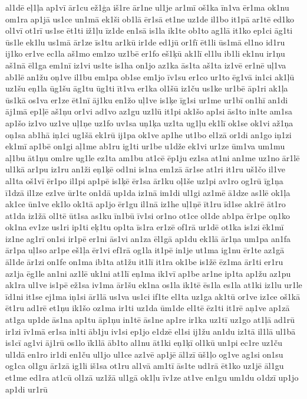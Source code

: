 {al1dē
eļ1ļa
ap1vī
ār1cu
ež1ģa
iš1re
ār1ne
ul1je
ar1mī
oš1ka
īn1va
ēr1ma
ok1nu
om1ra
ap1jā
us1ce
un1mā
ek1ši
ob1lā
ēr1sā
et1ne
uz1de
il1bo
it1pā
ar1tē
ed1ko
ol1vī
ot1rī
us1se
ēt1ti
iž1ļu
īz1de
en1sā
is1la
ik1te
ob1to
ag1lā
it1ko
ep1ci
āg1ti
ūs1le
ek1lu
us1mā
ār1ze
īs1tu
ar1kū
ir1de
ed1jū
or1fī
ēt1li
ūs1mā
el1no
id1ru
ij1ko
er1ve
ec1la
aš1mo
em1zo
uz1bē
er1fo
eš1ķū
ak1lī
el1lu
ib1li
ek1nu
ir1ņu
aš1nā
ēl1ga
em1nī
iz1vi
us1te
is1ha
on1jo
az1ka
ās1ta
aš1ta
iz1vē
er1nē
uļ1va
ab1lē
an1žu
oņ1ve
il1bu
em1pa
ob1se
em1jo
īv1su
er1co
ur1to
ēg1vā
in1ci
ak1ļū
uz1šu
eņ1la
ūg1šu
āg1tu
ūg1ti
īt1va
er1ka
ol1šū
iz1ču
us1ke
ur1bē
āp1ri
ak1ļa
ūs1kā
os1va
er1ze
ēt1nī
āj1ku
en1žo
uļ1ve
is1ķe
īg1si
ur1me
ur1bī
on1hī
an1di
āj1mā
ep1ļē
aš1ņu
or1vi
ad1vo
az1gu
uz1lū
it1pi
ak1šo
ap1si
ās1to
in1te
am1sa
ap1šo
iz1vo
uz1ve
uļ1ņe
uz1fo
uv1sa
uņ1ķa
uz1ta
ug1ļu
ek1lī
ok1se
ok1vi
až1ņa
oņ1sa
ab1hā
iņ1ci
ug1šā
ek1rū
ij1pa
ok1ve
ap1he
ut1bo
el1zā
or1di
an1go
iņ1zi
ek1mī
ap1bē
on1gi
aļ1me
ab1ru
ig1ti
ur1be
u1dže
ek1vi
ur1ze
ūm1va
um1mu
aļ1bu
āt1ņu
om1re
ug1le
ez1ta
am1bu
at1cē
ēp1ju
ez1sa
at1ni
an1me
uz1no
ār1lē
ul1kā
ar1pu
iz1ru
an1ži
eņ1ķē
od1ni
is1na
em1zā
ār1se
at1ri
it1ru
uš1čo
il1ve
al1ta
oš1vī
ēr1po
il1pi
ap1pē
is1ķē
ēr1sa
ār1ku
oļ1še
uz1pi
av1ro
og1rū
īg1ņa
ī1dzā
il1ze
ez1ve
ūr1te
on1dā
up1da
iz1nā
im1di
ul1gi
az1mē
ā1dze
as1lē
ok1ļa
ak1ce
ūn1ve
ek1lo
ok1tā
ap1jo
ēr1gu
il1nā
iz1he
uļ1ņē
īt1ru
īd1se
ak1rē
āt1ro
at1da
iz1žā
ol1tē
ūt1sa
as1ku
īn1bū
īv1si
or1no
ot1ce
ol1de
ab1pa
ēr1pe
oņ1ko
ok1na
ev1ze
us1ri
ip1ti
eķ1tu
op1ta
īs1ra
er1zē
of1rā
ur1dē
ot1ka
is1zi
ēk1mī
iz1ne
ag1rī
on1si
ir1pē
er1ni
ās1vi
an1za
ēl1gā
ap1du
ek1lā
ār1ņa
um1pa
an1fa
ār1pa
uļ1so
ar1pe
eš1ļa
ēr1vi
ef1rā
og1la
it1pē
in1je
ut1ma
ig1nu
ēr1te
az1gā
āl1de
ār1zi
on1fe
on1ma
ib1ta
at1žu
it1lī
it1ra
ok1be
is1žē
ēz1ma
ār1ti
er1ru
az1ja
ēg1le
an1ni
az1lē
uk1ni
at1lī
eņ1ma
ik1vī
ap1be
ar1ne
ip1ta
ap1žu
az1pu
ak1ra
ul1ve
is1pē
ež1sa
iv1ma
ār1šu
ek1na
os1la
ik1tē
ēs1la
es1la
at1ki
iz1lu
ur1le
īd1ni
it1se
ej1ma
iņ1si
ār1lā
us1va
us1ci
if1te
el1ta
uz1ga
ak1tū
or1ve
iz1ce
oš1kā
ēt1ru
ad1rē
et1ņu
ik1šo
oz1ma
ir1ti
uz1da
ūm1de
el1tē
ēz1ti
it1rē
aņ1ve
ap1zā
at1ga
up1de
ās1na
ap1tu
āp1ņu
in1tē
ās1ne
ap1re
ir1ka
uz1tī
uz1go
at1ļā
ad1rū
ir1zi
īv1mā
er1sa
in1ti
āb1ju
iv1si
ep1jo
e1dzē
el1si
ij1žu
an1du
iz1tā
il1lā
ul1bā
is1cī
ag1vi
āj1rū
os1lo
īk1lā
āb1to
al1nu
āt1ki
eņ1ķī
ol1kū
un1pi
ec1re
uz1ču
ul1dā
en1ro
ir1di
en1ču
ul1jo
ul1ce
az1vē
ap1jē
āl1zī
ūš1ļo
og1ve
ag1si
on1su
og1ca
ol1gu
ār1zā
ig1li
iš1sa
ot1ru
al1vā
am1tī
ās1te
ud1rā
ēt1ko
uz1jē
āl1gu
et1me
ed1ra
at1cū
ol1zā
uz1žā
ul1gā
ok1ļu
īv1ze
at1ve
en1gu
um1du
o1dzī
up1jo
ap1di
ur1rū
}

